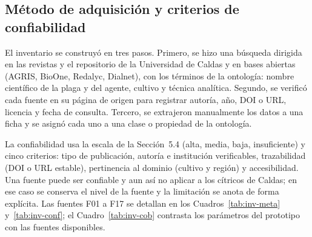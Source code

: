 
\subsection*{Método de adquisición y criterios de confiabilidad}

El inventario se construyó en tres pasos. Primero, se hizo una búsqueda dirigida en las revistas y el repositorio de la Universidad de Caldas y en bases abiertas (AGRIS, BioOne, Redalyc, Dialnet), con los términos de la ontología: nombre científico de la plaga y del agente, cultivo y técnica analítica. Segundo, se verificó cada fuente en su página de origen para registrar autoría, año, DOI o URL, licencia y fecha de consulta. Tercero, se extrajeron manualmente los datos a una ficha y se asignó cada uno a una clase o propiedad de la ontología.

La confiabilidad usa la escala de la Sección~5.4 (alta, media, baja, insuficiente) y cinco criterios: tipo de publicación, autoría e institución verificables, trazabilidad (DOI o URL estable), pertinencia al dominio (cultivo y región) y accesibilidad. Una fuente puede ser confiable y aun así no aplicar a los cítricos de Caldas; en ese caso se conserva el nivel de la fuente y la limitación se anota de forma explícita. Las fuentes F01 a F17 se detallan en los Cuadros~\ref{tab:inv-meta} y~\ref{tab:inv-conf}; el Cuadro~\ref{tab:inv-cob} contrasta los parámetros del prototipo con las fuentes disponibles.

\makeatletter\g@addto@macro\UrlBreaks{\do\-}\makeatother

